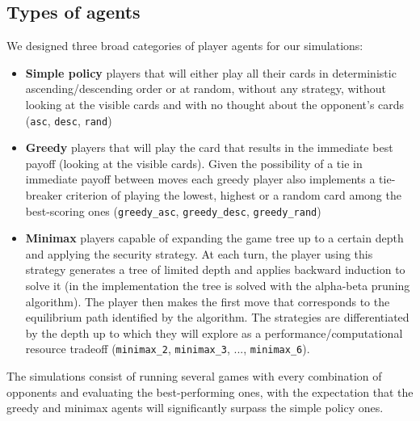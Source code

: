 \documentclass[conference]{IEEEtran}
\begin{document}
\subsection{Types of agents}
We designed three broad categories of player agents for our simulations:
\begin{itemize}
    \item \textbf{Simple policy} players that will either play all their cards in deterministic ascending/descending order or at random, without any strategy, without looking at the visible cards and with no thought about the opponent's cards (\verb|asc|, \verb|desc|, \verb|rand|)
    \item \textbf{Greedy} players that will play the card that results in the immediate best payoff (looking at the visible cards). Given the possibility of a tie in immediate payoff between moves each greedy player also implements a tie-breaker criterion of playing the lowest, highest or a random card among the best-scoring ones (\verb|greedy_asc|, \verb|greedy_desc|, \verb|greedy_rand|)
    \item \textbf{Minimax} players capable of expanding the game tree up to a certain depth and applying the security strategy. At each turn, the player using this strategy generates a tree of limited depth and applies backward induction to solve it (in the implementation the tree is solved with the alpha-beta pruning algorithm). The player then makes the first move that corresponds to the equilibrium path identified by the algorithm. The strategies are differentiated by the depth up to which they will explore as a performance/computational resource tradeoff (\verb|minimax_2|, \verb|minimax_3|, ..., \verb|minimax_6|).
    
\end{itemize}
The simulations consist of running several games with every combination of opponents and evaluating the best-performing ones, with the expectation that the greedy and minimax agents will significantly surpass the simple policy ones.
\end{document}
